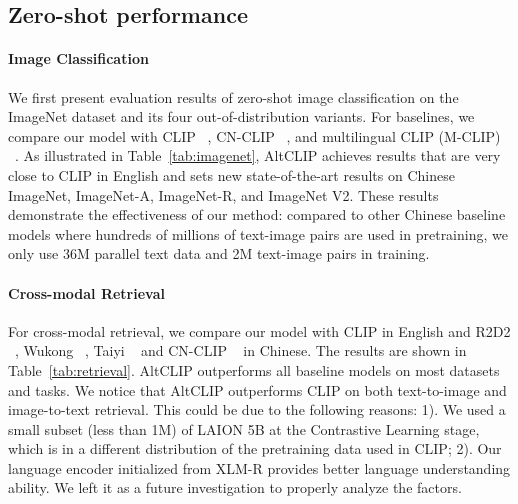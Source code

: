 \subsection{Zero-shot performance}
\label{sec5-2}
\paragraph{Image Classification}
We first present evaluation results of zero-shot image classification on the ImageNet dataset and its four out-of-distribution variants. For baselines, we compare our model with CLIP ~\cite{radford2021learning}, CN-CLIP ~\cite{yang2022chinese}, and multilingual CLIP (M-CLIP) ~\cite{carlsson2022cross}.
As illustrated in Table~\ref{tab:imagenet}, AltCLIP achieves results that are very close to CLIP in English and sets new state-of-the-art results on Chinese ImageNet, ImageNet-A, ImageNet-R, and ImageNet V2. These results demonstrate the effectiveness of our method: compared to other Chinese baseline models where hundreds of millions of text-image pairs are used in pretraining, we only use 36M parallel text data and 2M text-image pairs in training.

\paragraph{Cross-modal Retrieval}
For cross-modal retrieval, we compare our model with CLIP in English and R2D2 ~\cite{xie2022zero}, Wukong ~\cite{gu2022wukong}, Taiyi ~\cite{fengshenbang} and CN-CLIP ~\cite{yang2022chinese} in Chinese. The results are shown in Table~\ref{tab:retrieval}. AltCLIP outperforms all baseline models on most datasets and tasks. We notice that AltCLIP outperforms CLIP on both text-to-image and image-to-text retrieval. This could be due to the following reasons: 1). We used a small subset (less than 1M) of LAION 5B at the Contrastive Learning stage, which is in a different distribution of the pretraining data used in CLIP; 2). Our language encoder initialized from XLM-R provides better language understanding ability. We left it as a future investigation to properly analyze the factors.

